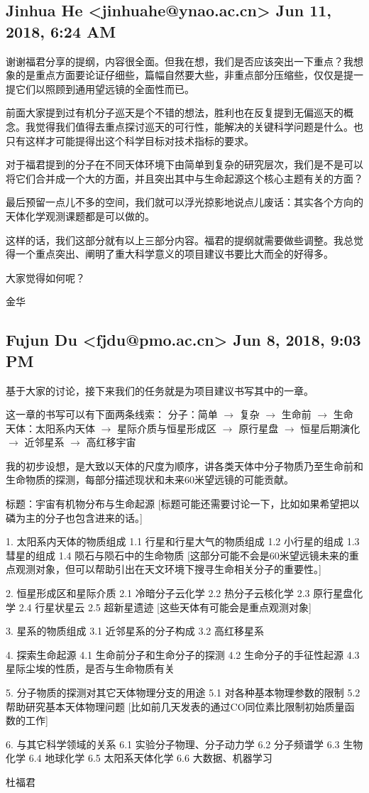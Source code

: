 \documentclass{article}
\newcommand\from[2]{\subsection{{#1} {#2}}}
\newcommand\said[1]{#1}
\begin{document}
\from{
Jinhua He <jinhuahe@ynao.ac.cn>
}{
Jun 11, 2018, 6:24 AM
}
\said{
谢谢福君分享的提纲，内容很全面。但我在想，我们是否应该突出一下重点？我想象的是重点方面要论证仔细些，篇幅自然要大些，非重点部分压缩些，仅仅是提一提它们以照顾到通用望远镜的全面性而已。

前面大家提到过有机分子巡天是个不错的想法，胜利也在反复提到无偏巡天的概念。我觉得我们值得去重点探讨巡天的可行性，能解决的关键科学问题是什么。也只有这样才可能提得出这个科学目标对技术指标的要求。

对于福君提到的分子在不同天体环境下由简单到复杂的研究层次，我们是不是可以将它们合并成一个大的方面，并且突出其中与生命起源这个核心主题有关的方面？

最后预留一点儿不多的空间，我们就可以浮光掠影地说点儿废话：其实各个方向的天体化学观测课题都是可以做的。

这样的话，我们这部分就有以上三部分内容。福君的提纲就需要做些调整。我总觉得一个重点突出、阐明了重大科学意义的项目建议书要比大而全的好得多。

大家觉得如何呢？

金华}


\from{Fujun Du <fjdu@pmo.ac.cn>
}{Jun 8, 2018, 9:03 PM}

\said{
基于大家的讨论，接下来我们的任务就是为项目建议书写其中的一章。

这一章的书写可以有下面两条线索：
分子：简单 $\rightarrow$ 复杂 $\rightarrow$ 生命前 $\rightarrow$ 生命
天体：太阳系内天体 $\rightarrow$ 星际介质与恒星形成区 $\rightarrow$ 原行星盘 $\rightarrow$ 恒星后期演化 $\rightarrow$ 近邻星系 $\rightarrow$ 高红移宇宙

我的初步设想，是大致以天体的尺度为顺序，讲各类天体中分子物质乃至生命前和生命物质的探测，每部分描述现状和未来60米望远镜的可能贡献。

标题：宇宙有机物分布与生命起源
[标题可能还需要讨论一下，比如如果希望把以磷为主的分子也包含进来的话。]

1. 太阳系内天体的物质组成
1.1 行星和行星大气的物质组成
1.2 小行星的组成
1.3 彗星的组成
1.4 陨石与陨石中的生命物质
[这部分可能不会是60米望远镜未来的重点观测对象，但可以帮助引出在天文环境下搜寻生命相关分子的重要性。]

2. 恒星形成区和星际介质
2.1 冷暗分子云化学
2.2 热分子云核化学
2.3 原行星盘化学
2.4 行星状星云
2.5 超新星遗迹
[这些天体有可能会是重点观测对象]

3. 星系的物质组成
3.1 近邻星系的分子构成
3.2 高红移星系

4. 探索生命起源
4.1 生命前分子和生命分子的探测
4.2 生命分子的手征性起源
4.3 星际尘埃的性质，是否与生命物质有关

5. 分子物质的探测对其它天体物理分支的用途
5.1 对各种基本物理参数的限制
5.2 帮助研究基本天体物理问题
[比如前几天发表的通过CO同位素比限制初始质量函数的工作]

6. 与其它科学领域的关系
6.1 实验分子物理、分子动力学
6.2 分子频谱学
6.3 生物化学
6.4 地球化学
6.5 太阳系天体化学
6.6 大数据、机器学习

杜福君
}
\end{document}
